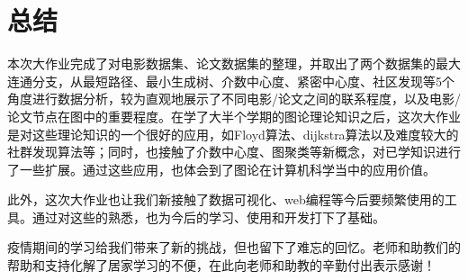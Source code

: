 \documentclass[UTF8, onecolumn, a4paper]{article}
\begin{document}
\section{总结}
    本次大作业完成了对电影数据集、论文数据集的整理，并取出了两个数据集的最大连通分支，从最短路径、最小生成树、介数中心度、紧密中心度、社区发现等5个角度进行数据分析，较为直观地展示了不同电影/论文之间的联系程度，以及电影/论文节点在图中的重要程度。在学了大半个学期的图论理论知识之后，这次大作业是对这些理论知识的一个很好的应用，如Floyd算法、dijkstra算法以及难度较大的社群发现算法等；同时，也接触了介数中心度、图聚类等新概念，对已学知识进行了一些扩展。通过这些应用，也体会到了图论在计算机科学当中的应用价值。
    
    此外，这次大作业也让我们新接触了数据可视化、web编程等今后要频繁使用的工具。通过对这些的熟悉，也为今后的学习、使用和开发打下了基础。
    
    疫情期间的学习给我们带来了新的挑战，但也留下了难忘的回忆。老师和助教们的帮助和支持化解了居家学习的不便，在此向老师和助教的辛勤付出表示感谢！




\appendix
\end{document}
